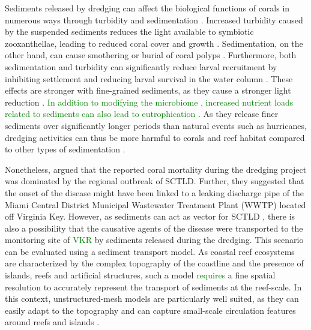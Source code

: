 \documentclass[preprint,12pt,authoryear]{elsarticle}
\newcommand{\modif}[1]{\textcolor{green}{#1}}
\begin{document}
Sediments released by dredging can affect the biological functions of corals in numerous ways  through turbidity and sedimentation \citep{erftemeijer2012environmental,jones2015effects}. Increased turbidity caused by the suspended sediments reduces the light available to symbiotic zooxanthellae, leading to reduced coral cover and growth \citep{kendall1983effects,anthony1999tank,hennige2008photoacclimation}. Sedimentation, on the other hand, can cause smothering or burial of coral polyps \citep{erftemeijer2012environmental,jones2015effects,jones2019sediment}. Furthermore, both sedimentation and turbidity can significantly reduce larval recruitment by inhibiting settlement and reducing larval survival in the water column \citep{jones2015effects}. These effects are stronger with fine-grained sediments, as they cause a stronger light reduction \citep{storlazzi2015influence,fourney2017additive}. \modif{In addition to modifying the microbiome \citep{rosales2019oceanographic}, increased nutrient loads related to sediments can also lead to eutrophication \citep{wittenberg1992effects}}.
As they release finer sediments over significantly longer periods than natural events such as hurricanes, dredging activities can thus be more harmful to corals and reef habitat compared to other types of sedimentation \citep{cunning2019extensive}.

Nonetheless, \cite{gintert2019regional} argued that the reported coral mortality during the dredging project was dominated by the regional outbreak of SCTLD. Further, they suggested that the onset of the disease might have been linked to a leaking discharge pipe of the Miami Central District Municipal Wastewater Treatment Plant (WWTP) located off Virginia Key. However, as sediments can act as vector for SCTLD \citep{studivan2022reef}, there is also a possibility that the causative agents of the disease were transported to the monitoring site of \modif{VKR} by sediments released during the dredging. This scenario can be evaluated using a sediment transport model. As coastal reef ecosystems are characterized by the complex topography of the coastline and the presence of islands, reefs and artificial structures, such a model \modif{requires} a fine spatial resolution to accurately represent the transport of sediments at the reef-scale. In this context, unstructured-mesh models are particularly well suited, as they can easily adapt to the topography \citep{fringer2019future} and can capture small-scale circulation features around reefs and islands \citep{lambrechts2008multi}.
\end{document}
